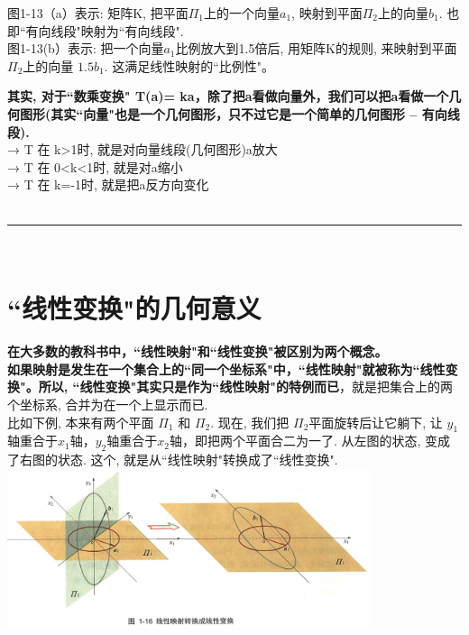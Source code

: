 \documentclass[UTF8]{ctexart}
\begin{document}
\begin{myEnvSample}
图1-13（a）表示: 矩阵K, 把平面$\varPi _1$上的一个向量$a_1$, 映射到平面$\varPi _2$上的向量$b_1$. 也即``有向线段"映射为``有向线段". \\
图1-13(b）表示: 把一个向量$a_1$比例放大到1.5倍后, 用矩阵K的规则, 来映射到平面$\varPi _2$上的向量 $1.5b_1$. 这满足线性映射的``比例性"。\\
\end{myEnvSample}


\textbf{其实, 对于``数乘变换" T(a)= ka，除了把a看做向量外，我们可以把a看做一个几何图形(其实``向量"也是一个几何图形，只不过它是一个简单的几何图形 -- 有向线段).}\\
→ T 在 k>1时, 就是对向量线段(几何图形)a放大 \\
→ T 在 0<k<1时, 就是对a缩小 \\
→ T 在 k=-1时, 就是把a反方向变化 \\

~\\
\hrule
~\\


\section{``线性变换"的几何意义}

\textbf{在大多数的教科书中，``线性映射"和``线性变换"被区别为两个概念。\\
如果映射是发生在一个集合上的``同一个坐标系"中，``线性映射"就被称为``线性变换"。所以, ``线性变换"其实只是作为``线性映射"的特例而已}，就是把集合上的两个坐标系, 合并为在一个上显示而已. \\

比如下例, 本来有两个平面 $\varPi_1$ 和 $\varPi_2$. 现在, 我们把 $\varPi_2$平面旋转后让它躺下,  让 $y_1$轴重合于$x_1$轴，$y_2$轴重合于$x_2$轴，即把两个平面合二为一了. 从左图的状态, 变成了右图的状态. 这个, 就是从``线性映射"转换成了``线性变换".\\

\includegraphics[width=0.8\textwidth]{img/0121.png}\\
\end{document}
